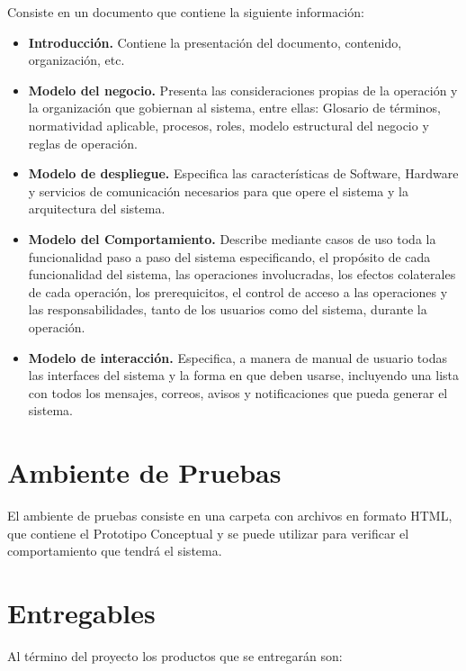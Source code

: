 \documentclass[10pt]{book}
\begin{document}
	Consiste en un documento que contiene la siguiente información:
	
\begin{itemize}
	\item {\bf Introducción.} Contiene la presentación del documento, contenido, organización, etc.
	\item {\bf Modelo del negocio.} Presenta las consideraciones propias de la operación y la organización que gobiernan al sistema, entre ellas: Glosario de términos, normatividad aplicable, procesos, roles, modelo estructural del negocio y reglas de operación.
	\item {\bf Modelo de despliegue.} Especifica las características de Software, Hardware y servicios de comunicación necesarios para que opere el sistema y la arquitectura del sistema.
	\item {\bf Modelo del Comportamiento.} Describe mediante casos de uso toda la funcionalidad paso a paso del sistema especificando, el propósito de cada funcionalidad del sistema, las operaciones involucradas, los efectos colaterales de cada operación, los prerequicitos, el control de acceso a las operaciones y las responsabilidades, tanto de los usuarios como del sistema, durante la operación.
	\item {\bf Modelo de interacción.} Especifica, a manera de manual de usuario todas las interfaces del sistema y la forma en que deben usarse, incluyendo una lista con todos los mensajes, correos, avisos y notificaciones que pueda generar el sistema.
\end{itemize}


\section{Ambiente de Pruebas}

	El ambiente de pruebas consiste en una carpeta con archivos en formato HTML, que contiene el Prototipo Conceptual y se puede utilizar para verificar el comportamiento que tendrá el sistema.

\section{Entregables}
	
	Al término del proyecto los productos que se entregarán son:
	
\end{document}
